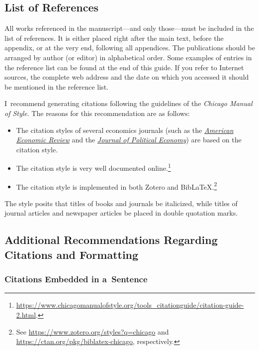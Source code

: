 \subsection{List of References}

All works referenced in the manuscript---and only those---must be included in the list of references. It is either placed right after the main text, before the appendix, or at the very end, following all appendices. The publications should be arranged by author (or editor) in alphabetical order. Some examples of entries in the reference list can be found at the end of this guide. If you refer to Internet sources, the complete web address and the date on which you accessed it should be mentioned in the reference list.

I~recommend generating citations following the guidelines of the \textit{Chicago Manual of Style}. The reasons for this recommendation are as follows:
\begin{itemize}
	\item The citation styles of several economics journals (such as the \href{https://www.aeaweb.org/journals/aer}{\textit{American Economic Review}} and the \href{https://www.journals.uchicago.edu/journal/jpe}{\textit{Journal of Political Economy}}) are based on the \textit{} citation style.
	\item The \textit{} citation style is very well documented online.\footnote{\url{https://www.chicagomanualofstyle.org/tools_citationguide/citation-guide-2.html}.}
	\item The \textit{} citation style is implemented in both Zotero and BibLaTeX.\footnote{See \url{https://www.zotero.org/styles?q=chicago} and \url{https://ctan.org/pkg/biblatex-chicago}, respectively.}
\end{itemize}

The \textit{} style posits that titles of books and journals be italicized, while titles of journal articles and newspaper articles be placed in double quotation marks.

\subsection{Additional Recommendations Regarding Citations and Formatting}

\subsubsection{Citations Embedded in a~Sentence}

